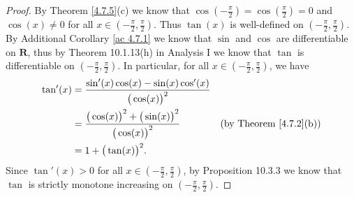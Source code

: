 \begin{proof}
    By Theorem \ref{4.7.5}(c) we know that \(\cos(-\frac{\pi}{2}) = \cos(\frac{\pi}{2}) = 0\) and \(\cos(x) \neq 0\) for all \(x \in (-\frac{\pi}{2}, \frac{\pi}{2})\).
    Thus \(\tan(x)\) is well-defined on \((-\frac{\pi}{2}, \frac{\pi}{2})\).
    By Additional Corollary \ref{ac 4.7.1} we know that \(\sin\) and \(\cos\) are differentiable on \(\mathbf{R}\), thus by Theorem 10.1.13(h) in Analysis I we know that \(\tan\) is differentiable on \((-\frac{\pi}{2}, \frac{\pi}{2})\).
    In particular, for all \(x \in (-\frac{\pi}{2}, \frac{\pi}{2})\), we have
    \begin{align*}
        \tan'(x) & = \frac{\sin'(x) \cos(x) - \sin(x) \cos'(x)}{\big(\cos(x)\big)^2}                                            \\
                 & = \frac{\big(\cos(x)\big)^2 + \big(\sin(x)\big)^2}{\big(\cos(x)\big)^2} & \text{(by Theorem \ref{4.7.2}(b))} \\
                 & = 1 + \big(\tan(x)\big)^2.
    \end{align*}
    Since \(\tan'(x) > 0\) for all \(x \in (-\frac{\pi}{2}, \frac{\pi}{2})\), by Proposition 10.3.3 we know that \(\tan\) is strictly monotone increasing on \((-\frac{\pi}{2}, \frac{\pi}{2})\).


\end{proof}
